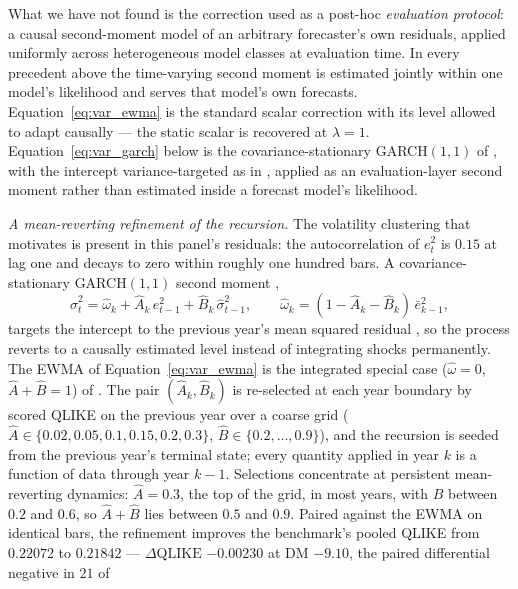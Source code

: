 What we have not found is the correction used as a post-hoc \emph{evaluation protocol}: a causal second-moment model of an arbitrary
forecaster's own residuals, applied uniformly across heterogeneous
model classes at evaluation time. In every precedent above the
time-varying second moment is estimated jointly within one model's
likelihood and serves that model's own forecasts.
Equation~\eqref{eq:var_ewma} is the standard scalar correction with
its level allowed to adapt causally --- the static scalar is recovered
at $\lambda = 1$. Equation~\eqref{eq:var_garch} below is the
covariance-stationary GARCH$(1,1)$ of \citet{Bollerslev1986}, with
the intercept variance-targeted as in \citet{EngleMezrich1996},
applied as an evaluation-layer second moment rather than estimated
inside a forecast model's likelihood.

\emph{A mean-reverting refinement of the recursion.} The volatility
clustering that motivates \citet{CorsiMittnikPigorschPigorsch2008} is
present in this panel's residuals: the autocorrelation of $e_t^2$ is
$0.15$ at lag one and decays to zero within roughly one hundred bars.
A covariance-stationary GARCH$(1,1)$ second moment
\citep{Bollerslev1986},
\begin{equation}
    \hat{\sigma}^2_t
    = \hat\omega_k + \hat{A}_k\, e_{t-1}^2
      + \hat{B}_k\, \hat{\sigma}^2_{t-1},
    \qquad
    \hat\omega_k = (1 - \hat{A}_k - \hat{B}_k)\,\bar{e}^2_{k-1},
    \label{eq:var_garch}
\end{equation}
targets the intercept to the previous year's mean squared residual
\citep{EngleMezrich1996}, so the process reverts to a causally
estimated level instead of integrating shocks permanently. The EWMA of
Equation~\eqref{eq:var_ewma} is the integrated special case
($\hat\omega = 0$, $\hat{A}+\hat{B}=1$) of
\citet{EngleBollerslev1986}. The pair
$(\hat{A}_k, \hat{B}_k)$ is re-selected at each year boundary by
scored QLIKE on the previous year over a coarse grid
($\hat{A} \in \{0.02, 0.05, 0.1, 0.15, 0.2, 0.3\}$,
$\hat{B} \in \{0.2, \dots, 0.9\}$), and the recursion is seeded from
the previous year's terminal state; every quantity applied in year $k$
is a function of data through year $k-1$. Selections concentrate at
persistent mean-reverting dynamics: $\hat{A} = 0.3$, the top of the
grid, in most years, with $\hat{B}$ between $0.2$ and $0.6$, so
$\hat{A} + \hat{B}$ lies between $0.5$ and $0.9$. Paired against the
EWMA on identical bars, the refinement improves the benchmark's pooled
QLIKE from $0.22072$ to $0.21842$ --- $\Delta\mathrm{QLIKE}$
$-0.00230$ at DM $-9.10$, the paired differential negative in $21$ of
